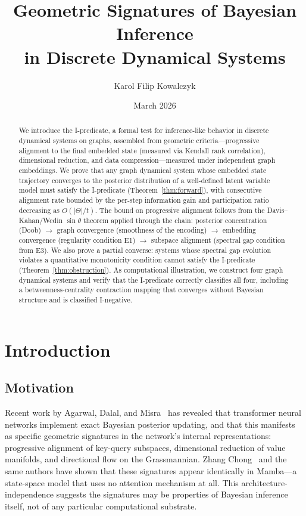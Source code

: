 \documentclass{../shared/primo}
\title{Geometric Signatures of Bayesian Inference\\in Discrete Dynamical Systems}
\author{Karol Filip Kowalczyk}
\affiliation{AIRON Games}
\date{March 2026}
\begin{document}
\maketitle

\begin{abstract}
We introduce the I-predicate, a formal test for inference-like behavior in discrete dynamical systems on graphs, assembled from geometric criteria---progressive alignment to the final embedded state (measured via Kendall rank correlation), dimensional reduction, and data compression---measured under independent graph embeddings. We prove that any graph dynamical system whose embedded state trajectory converges to the posterior distribution of a well-defined latent variable model must satisfy the I-predicate (Theorem~\ref{thm:forward}), with consecutive alignment rate bounded by the per-step information gain and participation ratio decreasing as $O(|\Theta|/t)$. The bound on progressive alignment follows from the Davis--Kahan/Wedin $\sin\theta$ theorem applied through the chain: posterior concentration (Doob) $\to$ graph convergence (smoothness of the encoding) $\to$ embedding convergence (regularity condition E1) $\to$ subspace alignment (spectral gap condition from E3). We also prove a partial converse: systems whose spectral gap evolution violates a quantitative monotonicity condition cannot satisfy the I-predicate (Theorem~\ref{thm:obstruction}). As computational illustration, we construct four graph dynamical systems and verify that the I-predicate correctly classifies all four, including a betweenness-centrality contraction mapping that converges without Bayesian structure and is classified I-negative.
\end{abstract}

\section{Introduction}
\label{sec:intro}

\subsection{Motivation}

Recent work by Agarwal, Dalal, and Misra~\cite{agarwal2026bayesian,agarwal2025gradient} has revealed that transformer neural networks implement exact Bayesian posterior updating, and that this manifests as specific geometric signatures in the network's internal representations: progressive alignment of key-query subspaces, dimensional reduction of value manifolds, and directional flow on the Grassmannian. Zhang Chong~\cite{zhang2025grassmann} and the same authors have shown that these signatures appear identically in Mamba---a state-space model that uses no attention mechanism at all. This architecture-independence suggests the signatures may be properties of Bayesian inference itself, not of any particular computational substrate.
\end{document}
